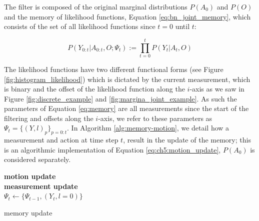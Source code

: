 The filter is composed of the original marginal distributions $P(A_0)$ and $P(O)$ and the memory of likelihood functions, Equation \ref{eq:bn_joint_memory},
which consists of the set of all likelihood functions since $t=0$ until $t$: 

\begin{equation}
 P(Y_{0:t}|A_{0:t},O;\Psi_t) := \prod_{t=0}^t P(Y_t|A_t,O) \label{eq:memory}
\end{equation}

The likelihood functions have two different functional forms (see Figure \ref{fig:histogram_likelihood}) which is dictated 
by the current measurement, which is binary and the offset of the likelihood function along the $i$-axis as we saw in
Figure \ref{fig:discrete_example} and \ref{fig:margina_joint_example}. As such the parameters of Equation \ref{eq:memory}
are all measurements since the start of the filtering and offsets along the $i$-axis, we refer to these parameters
as $\Psi_t = \{(Y,l)_p\}_{p=0:t}$. In Algorithm \ref{alg:memory-motion}, we detail how a measurement and action at 
time step $t$, result in the update of the memory; this is an algorithmic implementation of Equation  \ref{eq:ch5:motion_update},
$P(A_0)$ is considered separately.

\begin{center}
\begin{minipage}{.55\linewidth}

\begin{algorithm}[H]
\label{alg:memory-motion}

\BlankLine
\textbf{motion update}\label{alg:ch5:motion_memory}\\
\textbf{measurement update}\\
$\Psi_t \gets \{\Psi_{t-1}, (Y_t,l=0)\}$ 

\caption{memory update}

\end{algorithm} 
\end{minipage}
\end{center}



